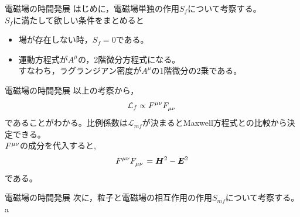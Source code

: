 \documentclass[unicode, aspectratio=169, 12pt]{beamer}
\begin{document}
\begin{frame}{電磁場の時間発展}
    はじめに，電磁場単独の作用$S_f$について考察する。\\
    $S_f$に満たして欲しい条件をまとめると
    \begin{itemize}
        \item 場が存在しない時，$S_f=0$である。
        \item 運動方程式が$A^\mu$の，2階微分方程式になる。\\
        すなわち，ラグランジアン密度が$A^\mu$の1階微分の2乗である。
    \end{itemize}
\end{frame}

\begin{frame}{電磁場の時間発展}
    以上の考察から，
    \begin{align*}
        \mathcal{L}_f\propto\tensor{F}{^\mu^\nu}\tensor{F}{_\mu_\nu}
    \end{align*}
    であることがわかる。比例係数は$\mathcal{L}_{mf}$が決まるとMaxwell方程式との比較から決定できる。\\
    $\tensor{F}{^\mu^\nu}$の成分を代入すると,
    \begin{align*}
        \tensor{F}{^\mu^\nu}\tensor{F}{_\mu_\nu}=\bm{H}^2-\bm{E}^2
    \end{align*}
    である。
\end{frame}

\begin{frame}{電磁場の時間発展}
    次に，粒子と電磁場の相互作用の作用$S_{mf}$について考察する。\\
    a
\end{frame}
\end{document}
